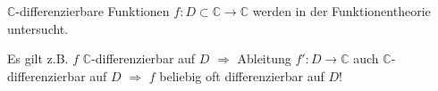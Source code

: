 \begin{hint}
	$\mathbb{C}$-\gls{differenzierbar}e Funktionen $f:D\subset \mathbb{C}\to\mathbb{C}$ werden in der Funktionentheorie untersucht.
	
	Es gilt z.B. $f$ $\mathbb{C}$-\gls{differenzierbar} auf $D$ $\Rightarrow$ Ableitung $f':D\to\mathbb{C}$ auch $\mathbb{C}$-\gls{differenzierbar} auf $D$ $\Rightarrow$ $f$ beliebig oft \gls{differenzierbar} auf $D$!
\end{hint}